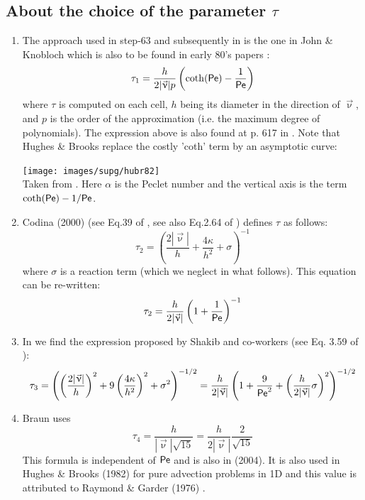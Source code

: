 \subsection{About the choice of the parameter $\tau$}\label{ss:tausupg}

\begin{enumerate}
\item The approach used in step-63 and subsequently in \aspect{} is the 
one in John \& Knobloch \cite{jokn06,knob08} which is also to be found in early 
80's papers \cite{brhu82,hubr82}:
\[
\tau_1 = \frac{h}{2 |\vec\upnu| p} \left( \coth ({\mathsf{Pe}}) - \frac{1}{{\mathsf{Pe}}} \right)
\]
where $\tau$ is computed on each cell, $h$ being its diameter in the direction of $\vec\upnu$, 
and $p$ is the order of the approximation (i.e. the maximum degree of polynomials).
The expression above is also found at p. 617 in \textcite{lomw12}.
Note that Hughes \& Brooks \cite{hubr82} replace the costly 'coth' term by an asymptotic curve:

\begin{center}
\texttt{[image: images/supg/hubr82]}\\
{\captionfont Taken from \cite{hubr82}. Here $\alpha$ is the Peclet number and the vertical axis
is the term $ \coth ({\mathsf{Pe}}) -1/{\mathsf{Pe}}$.}
\end{center}


\item
Codina (2000) (see Eq.39 of \cite{codi00}, see also Eq.2.64 of \textcite{dohu03}) defines $\tau$ as follows:
\[
\tau_2= \left( \frac{2 |\vec\upnu|}{h} + \frac{4 \kappa}{h^2} + \sigma   \right)^{-1}
\]
where $\sigma$ is a reaction term (which we neglect in what follows). This equation 
can be re-written:
\[
\tau_2= \frac{h}{2 |\vec\upnu|} \left( 1 + \frac{1}{{\mathsf{Pe}}} \right)^{-1}
\]



\item In \textcite{dohu03} we find the expression proposed by Shakib and co-workers (see Eq. 3.59 of \cite{shhj91}):
\[
\tau_3=\left( \left(\frac{2|\vec\upnu|}{h} \right)^2 
+9 \left(\frac{4\kappa}{h^2} \right)^2 + \sigma^2  \right)^{-1/2}
= \frac{h}{2|\vec\upnu|} \left(  1 + \frac{9}{{\mathsf{Pe}}^2} 
+ \left(\frac{h}{2|\vec\upnu|} \sigma  \right)^2 \right)^{-1/2}
\]

\item
Braun \cite{brau03} uses 
\[
\tau_4 = \frac{h}{|\vec\upnu| \sqrt{15}} = \frac{h}{2|\vec\upnu|} \frac{2}{\sqrt{15}} 
\]
This formula is independent of ${\mathsf{Pe}}$ and is also in \textcite{bogs04} (2004).
It is also used in Hughes \& Brooks (1982) \cite{hubr82} for pure advection problems in 1D
and this value is attributed to Raymond \& Garder (1976)  \cite{raga76}.


\end{enumerate}
